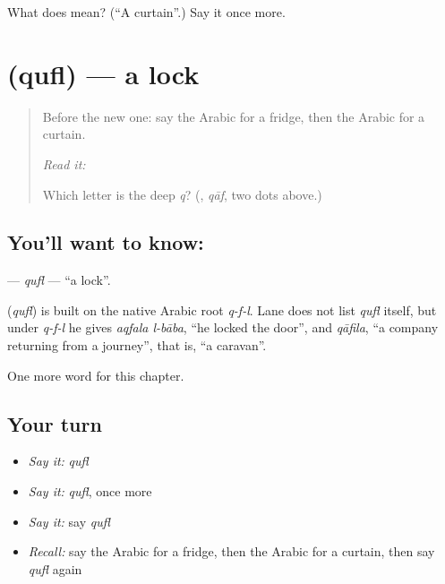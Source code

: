 \begin{tcolorbox}[breakable,colback=teal!4,colframe=teal!35!black,title={Before you move on}]
What does  mean? (\textquotedblleft{}A curtain\textquotedblright{}.) Say it once more.
\end{tcolorbox}
\section[\texorpdfstring{\ar{قفل} (qufl)}{قفل (qufl)}]{ (qufl) — a lock}

\label{lesson:AR-C127-qifl}



\begin{quote}
Before the new one: say the Arabic for a fridge, then the Arabic for a curtain.

\emph{Read it:} \textbf{}

Which letter is the deep \emph{q}? (\textbf{}, \emph{qāf}, two dots above.)
\end{quote}

\subsection*{You'll want to know: }
\textbf{} — \emph{qufl} — \textquotedblleft{}a lock\textquotedblright{}.

\begin{cousinweb}
\textbf{} (\emph{qufl}) is built on the native Arabic root \emph{q-f-l}. Lane does not list \emph{qufl} itself, but under \emph{q-f-l} he gives \emph{aqfala l-bāba}, \textquotedblleft{}he locked the door\textquotedblright{}, and \emph{qāfila}, \textquotedblleft{}a company returning from a journey\textquotedblright{}, that is, \textquotedblleft{}a caravan\textquotedblright{}.
\end{cousinweb}

\begin{grammarlens}[title={What you've built}]
One more word for this chapter.
\end{grammarlens}

\subsection*{Your turn}
\begin{itemize}
\raggedright
  \item \emph{Say it:} \emph{qufl}
  \item \emph{Say it:} \emph{qufl}, once more
  \item \emph{Say it:} say \emph{qufl}
  \item \emph{Recall:} say the Arabic for a fridge, then the Arabic for a curtain, then say \emph{qufl} again
\end{itemize}

